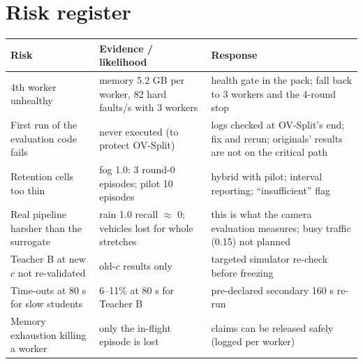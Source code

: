 \documentclass[11pt,a4paper]{article}
\begin{document}
\section{Risk register}
\begin{center}\small\begin{tabular}{@{}p{4.3cm}p{5.6cm}p{5.4cm}@{}}\toprule
Risk & Evidence / likelihood & Response\\\midrule
4th worker unhealthy & memory 5.2 GB per worker, 82 hard faults/s with 3 workers & health gate in the pack; fall back to 3 workers and the 4-round stop\\
First run of the evaluation code fails & never executed (to protect OV-Split) & logs checked at OV-Split's end; fix and rerun; originals' results are not on the critical path\\
Retention cells too thin & fog 1.0: 3 round-0 episodes; pilot 10 episodes & hybrid with pilot; interval reporting; ``insufficient'' flag\\
Real pipeline harsher than the surrogate & rain 1.0 recall $\approx$ 0; vehicles lost for whole stretches & this is what the camera evaluation measures; busy traffic (0.15) not planned\\
Teacher B at new $c$ not re-validated & old-$c$ results only & targeted simulator re-check before freezing\\
Time-outs at 80 s for slow students & 6--11\% at 80 s for Teacher B & pre-declared secondary 160 s re-run\\
Memory exhaustion killing a worker & only the in-flight episode is lost & claims can be released safely (logged per worker)\\\bottomrule\end{tabular}\end{center}
\end{document}
